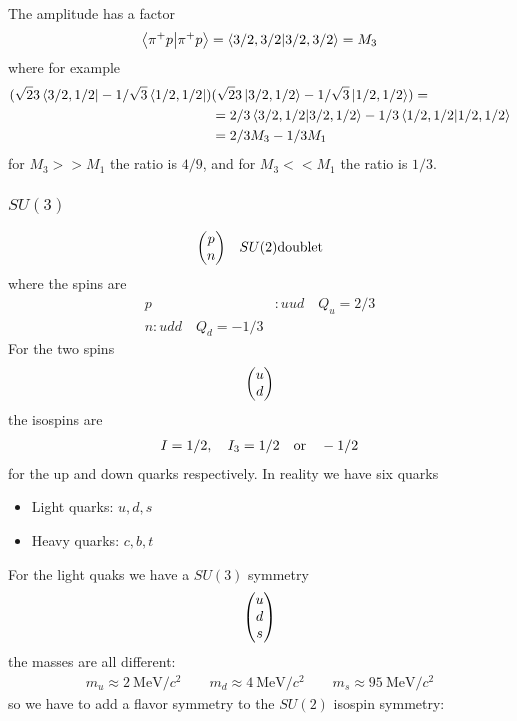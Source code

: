 \documentclass[../main.tex]{subfiles}
\begin{document}
The amplitude has a factor
\begin{align*}
    \braket{\pi^+ p}{\pi^+ p} = \braket{3/2, 3/2}{3/2, 3/2} = M_3
\end{align*}
where for example 
\begin{align*}
    (\sqrt{2}{3} \bra{3/2, 1/2} - 1/\sqrt{3} \bra{1/2, 1/2})
    &(\sqrt{2}{3} \ket{3/2, 1/2} - 1/\sqrt{3} \ket{1/2, 1/2}) = \\
    &= 2/3 \braket{3/2, 1/2}{3/2, 1/2} - 1/3 \braket{1/2, 1/2}{1/2, 1/2} \\
    &= 2/3 M_3 - 1/3 M_1
\end{align*}
for $M_3 >> M_1$ the ratio is $4/9$, and for $M_3 << M_1$ the ratio is $1/3$.

\subsubsection*{$SU(3)$}
\begin{align*}
    \mqty(p \\ n) \quad SU(2) \textrm{doublet}
\end{align*}
where the spins are
\begin{align*}
    p&: uud \quad Q_u = 2/3 \\
    n: udd \quad Q_d = -1/3
\end{align*}
For the two spins
\begin{align*}
    \mqty(u \\ d)
\end{align*}
the isospins are
\begin{align*}
    I = 1/2, \quad I_3 = 1/2 \qor -1/2
\end{align*}
for the up and down quarks respectively. In reality we have six quarks
\begin{itemize}
    \item Light quarks: $u, d, s$
    \item Heavy quarks: $c, b, t$
\end{itemize}
For the light quaks we have a $SU(3)$ symmetry
\begin{align*}
    \mqty(u \\ d \\ s)
\end{align*}
the masses are all different:
\begin{align*}
    m_u \approx \qty{2}{\MeV / c^2} \qquad 
    m_d \approx \qty{4}{\MeV / c^2} \qquad 
    m_s \approx \qty{95}{\MeV / c^2}
\end{align*}
so we have to add a flavor symmetry to the $SU(2)$ isospin symmetry:
\end{document}
